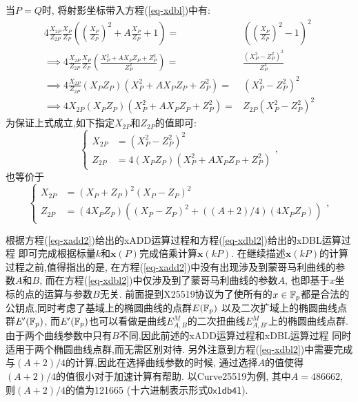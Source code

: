 当$P=Q$时, 将射影坐标带入方程(\ref{eq-xdbl})中有:
\begin{equation*}
\begin{array}{rl}
4\frac{X_{2P}}{Z_{2P}}\frac{X_P}{Z_P}\left( \left(\frac{X_P}{Z_P} \right)^2 + A\frac{X_P}{Z_P} + 1\right) = & \left( \left(\frac{X_P}{Z_P}\right)^2 - 1 \right)^2 \\
\implies 
4\frac{X_{2P}}{Z_{2P}}\frac{X_P}{Z_P} \left(\frac{X_P^2 + AX_PZ_P + Z_P^2}{Z_P^2} \right) = & 
\frac{\left(X_P^2 - Z_P^2\right)^2}{Z_P^4}\\
\implies 
4\frac{X_{2P}}{Z_{2P}}(X_PZ_P)\left(X_P^2 + AX_PZ_P + Z_P^2 \right) = & 
\left(X_P^2 - Z_P^2\right)^2\\
\implies 
4X_{2P}(X_PZ_P)\left(X_P^2 + AX_PZ_P + Z_P^2 \right) = & 
Z_{2P}\left(X_P^2 - Z_P^2\right)^2
\end{array}
\end{equation*}
为保证上式成立,如下指定$X_{2P}$和$Z_{2P}$的值即可:
\begin{equation*}
\left\{
\begin{array}{ll}
X_{2P} & = \left(X_P^2 - Z_P^2\right)^2\\
Z_{2P} & = 4(X_PZ_P)\left(X_P^2 + AX_PZ_P + Z_P^2 \right)
\end{array},
\right.
\end{equation*}
也等价于
\begin{equation}\label{eq-xdbl2}
\left\{
\begin{array}{ll}
X_{2P} & = (X_P+Z_P)^2(X_P-Z_P)^2\\
Z_{2P} & = (4X_PZ_P)((X_P-Z_P)^2 + ((A+2)/4)(4X_PZ_P))
\end{array},
\right.
\end{equation}

根据方程(\ref{eq-xadd2})给出的\textsf{xADD}运算过程和方程(\ref{eq-xdbl2})给出的\textsf{xDBL}运算过程
即可完成根据标量$k$和$\mathbf{x}(P)$完成倍乘计算$\mathbf{x}(kP)$.
在继续描述$\mathbf{x}(kP)$的计算过程之前,值得指出的是,
在方程(\ref{eq-xadd2})中没有出现涉及到蒙哥马利曲线的参数$A$和$B$,
而在方程(\ref{eq-xdbl2})中仅涉及到了蒙哥马利曲线的参数$A$,
也即基于$x$坐标的点的运算与参数$B$无关.
前面提到X25519协议为了使所有的$x\in\mathbb{F}_p$都是合法的公钥点,同时考虑了基域上的椭圆曲线的点群$E(\mathbb{F}_p)$
以及二次扩域上的椭圆曲线点群$E'(\mathbb{F}_p)$, 
而$E'(\mathbb{F}_p)$也可以看做是曲线$E_{A,B}^M$的二次扭曲线$E_{A,B'}^M$上的椭圆曲线点群.
由于两个曲线参数中只有$B$不同,因此前述的\textsf{xADD}运算过程和\textsf{xDBL}运算过程
同时适用于两个椭圆曲线点群,而无需区别对待.
另外注意到方程(\ref{eq-xdbl2})中需要完成与$(A+2)/4$的计算,因此在选择曲线参数的时候,
通过选择$A$的值使得$(A+2)/4$的值很小对于加速计算有帮助.
以Curve25519为例, 其中$A = 486662$, 则$(A+2)/4$的值为121665 (十六进制表示形式$\textsf{0x1db41}$).

